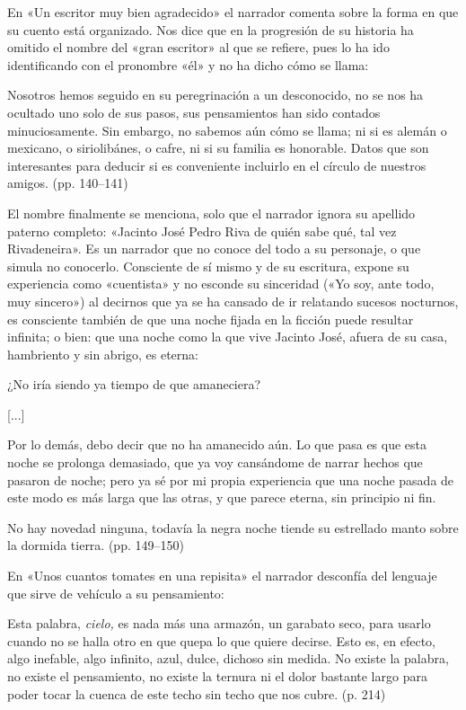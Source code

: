 \documentclass[14pt,twoside,final]{extbook} %
\begin{document}
En «Un escritor muy bien agradecido» el narrador comenta sobre la forma en que su cuento está organizado. Nos dice que en la progresión de su historia ha omitido el nombre del «gran escritor» al que se refiere, pues lo ha ido identificando con el pronombre «él» y no ha dicho cómo se llama:
\begin{quoting}
Nosotros hemos seguido en su peregrinación a un desconocido, no se nos ha ocultado uno solo de sus pasos, sus pensamientos han sido contados minuciosamente. Sin embargo, no sabemos aún cómo se llama; ni si es alemán o mexicano, o siriolibánes, o cafre, ni si su familia es honorable. Datos que son interesantes para deducir si es conveniente incluirlo en el círculo de nuestros amigos. (pp. 140--141)
\end{quoting}
El nombre finalmente se menciona, solo que el narrador ignora su apellido paterno completo: «Jacinto José Pedro Riva de quién sabe qué, tal vez Rivadeneira». Es un narrador que no conoce del todo a su personaje, o que simula no conocerlo. Consciente de sí mismo y de su escritura, expone su experiencia como «cuentista» y no esconde su sinceridad («Yo soy, ante todo, muy sincero») al decirnos que ya se ha cansado de ir relatando sucesos nocturnos, es consciente también de que una noche fijada en la ficción puede resultar infinita; o bien: que una noche como la que vive Jacinto José, afuera de su casa, hambriento y sin abrigo, es eterna:
\begin{quoting}
¿No iría siendo ya tiempo de que amaneciera?

\centerline{[...]}

Por lo demás, debo decir que no ha amanecido aún. Lo que pasa es que esta noche se prolonga demasiado, que ya voy cansándome de narrar hechos que pasaron de noche; pero ya sé por mi propia experiencia que una noche pasada de este modo es más larga que las otras, y que parece eterna, sin principio ni fin.

No hay novedad ninguna, todavía la negra noche tiende su estrellado manto sobre la dormida tierra. (pp. 149--150)
\end{quoting}
En «Unos cuantos tomates en una repisita» el narrador desconfía del lenguaje que sirve de vehículo a su pensamiento:
\begin{quoting}
Esta palabra, \emph{cielo,} es nada más una armazón, un garabato seco, para usarlo cuando no se halla otro en que quepa lo que quiere decirse. Esto es, en efecto, algo inefable, algo infinito, azul, dulce, dichoso sin medida. No existe la palabra, no existe el pensamiento, no existe la ternura ni el dolor bastante largo para poder tocar la cuenca de este techo sin techo que nos cubre. (p. 214)
\end{quoting}
\end{document}
